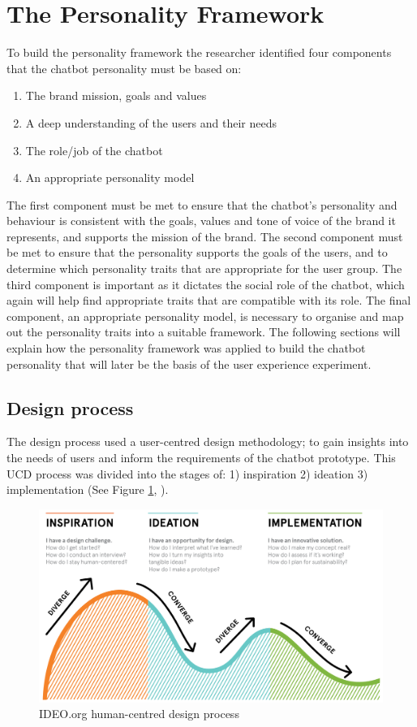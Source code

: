 \section{The Personality Framework}

To build the personality framework the researcher identified four components that the chatbot personality must be based on:

\begin{enumerate}
    \item The brand mission, goals and values
    \item A deep understanding of the users and their needs 
    \item The role/job of the chatbot
    \item An appropriate personality model
\end{enumerate}

The first component must be met to ensure that the chatbot's personality and behaviour is consistent with the goals, values and tone of voice of the brand it represents, and supports the mission of the brand. The second component must be met to ensure that the personality supports the goals of the users, and to determine which personality traits that are appropriate for the user group. The third component is important as it dictates the social role of the chatbot, which again will help find appropriate traits that are compatible with its role. The final component, an appropriate personality model, is necessary to organise and map out the personality traits into a suitable framework. The following sections will explain how the personality framework was applied to build the chatbot personality that will later be the basis of the user experience experiment.

\subsection{Design process}

 The design process used a user-centred design methodology; to gain insights into the needs of users and inform the requirements of the chatbot prototype. This UCD process was divided into the stages of:  1) inspiration 2) ideation 3) implementation (See Figure \ref{fig:ideo}, \cite{IDEO.org}).

\begin{figure}[H]
    \centering
    \includegraphics [width=\textwidth] {figures/IDEO.png}
    \caption{IDEO.org human-centred design process}
    \label{fig:ideo}
\end{figure}

